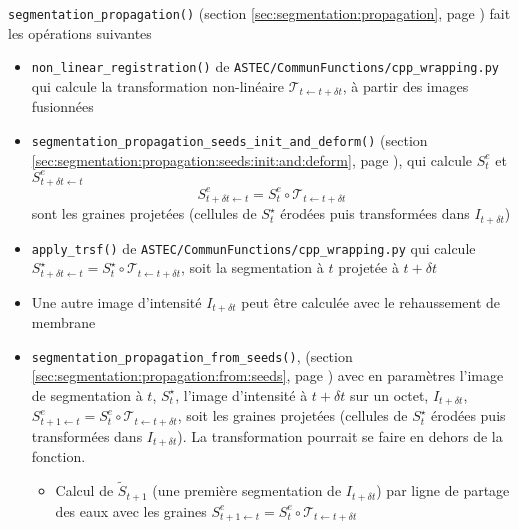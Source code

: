 \documentclass{article}
\begin{document}
\texttt{segmentation\_propagation()} (section \ref{sec:segmentation:propagation}, page \pageref{sec:segmentation:propagation}) fait les op\'erations suivantes
\begin{itemize}
\itemsep -0.5ex

\item \texttt{non\_linear\_registration()} de \texttt{ASTEC/CommunFunctions/cpp\_wrapping.py} qui calcule  la transformation non-lin\'eaire $\mathcal{T}_{t \leftarrow t+\delta t}$, \`a partir des images fusionn\'ees

\item \texttt{segmentation\_propagation\_seeds\_init\_and\_deform()} (section \ref{sec:segmentation:propagation:seeds:init:and:deform}, page \pageref{sec:segmentation:propagation:seeds:init:and:deform}),
qui calcule $S^e_t$ et $S^e_{t+\delta t \leftarrow t}$
\begin{displaymath}
S^e_{t+\delta t \leftarrow t} = S^e_t \circ \mathcal{T}_{t \leftarrow t+\delta t}
\end{displaymath}
sont les graines projet\'ees (cellules de $S^{\star}_t$ \'erod\'ees puis transform\'ees dans $I_{t+\delta t}$) \cite[section 2.3.3.4]{guignard:tel-01278725}

\item \texttt{apply\_trsf()} de \texttt{ASTEC/CommunFunctions/cpp\_wrapping.py} qui calcule $S^{\star}_{t+\delta t \leftarrow t} = S^{\star}_t \circ \mathcal{T}_{t \leftarrow t+\delta t}$, soit la segmentation \`a $t$ projet\'ee \`a $t + \delta t$

\item Une autre image d'intensit\'e $I_{t + \delta t}$ peut \^etre calcul\'ee avec le rehaussement de membrane





%
%
\item \texttt{segmentation\_propagation\_from\_seeds()}, (section \ref{sec:segmentation:propagation:from:seeds}, page \pageref{sec:segmentation:propagation:from:seeds}) avec en param\`etres
l'image de segmentation \`a $t$, $S^{\star}_t$,
l'image d'intensit\'e \`a $t + \delta t$ sur un octet,  $I_{t+\delta t}$,
$S^e_{t+1 \leftarrow t} = S^e_t \circ \mathcal{T}_{t \leftarrow t+\delta t}$, soit les graines projet\'ees (cellules de $S^{\star}_t$ \'erod\'ees puis transform\'ees dans $I_{t+\delta t}$). La transformation pourrait se faire en dehors de la fonction.

\begin{itemize}
\item Calcul de $\tilde{S}_{t+1}$ (une premi\`ere segmentation de $I_{t + \delta t}$) par ligne de partage des eaux avec les graines $S^e_{t+1 \leftarrow t} = S^e_t \circ \mathcal{T}_{t \leftarrow t+\delta t}$


\end{itemize}
\end{itemize}
\end{document}
